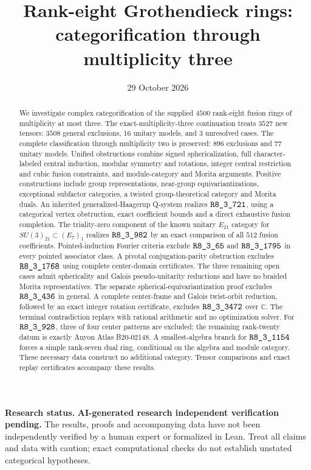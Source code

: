 \documentclass[11pt,reqno]{amsart}
\title{Rank-eight Grothendieck rings:\\
categorification through multiplicity three}
\date{29 October 2026}
\theoremstyle{definition}
\theoremstyle{remark}
\newcommand{\sha}[1]{\texttt{\detokenize{#1}}}
\begin{document}
\begin{abstract}
We investigate complex categorification of the supplied $4500$ rank-eight fusion rings of multiplicity at most three. The exact-multiplicity-three continuation treats $3527$ new tensors: $3508$ general exclusions, $16$ unitary models, and $3$ unresolved cases. The complete classification through multiplicity two is preserved: $896$ exclusions and $77$ unitary models. Unified obstructions combine signed sphericalization, full character-labeled central induction, modular symmetry and rotations, integer central restriction and cubic fusion constraints, and module-category and Morita arguments. Positive constructions include group representations, near-group equivariantizations, exceptional subfactor categories, a twisted group-theoretical category and Morita duals. An inherited generalized-Haagerup Q-system realizes $\sha{R8_3_721}$, using a categorical vertex obstruction, exact coefficient bounds and a direct exhaustive fusion completion. The triality-zero component of the known unitary $E_{21}$ category for $SU(3)_{21}\subset(E_7)_1$ realizes $\sha{R8_3_982}$ by an exact comparison of all $512$ fusion coefficients. Pointed-induction Fourier criteria exclude $\sha{R8_3_65}$ and $\sha{R8_3_1795}$ in every pointed associator class. A pivotal conjugation-parity obstruction excludes $\sha{R8_3_1768}$ using complete center-domain certificates. The three remaining open cases admit sphericality and Galois pseudo-unitarity reductions and have no braided Morita representatives. The separate spherical-equivariantization proof excludes $\sha{R8_3_436}$ in general. A complete center-frame and Galois twist-orbit reduction, followed by an exact integer rotation certificate, excludes $\sha{R8_3_3472}$ over $\mathbb C$. The terminal contradiction replays with rational arithmetic and no optimization solver. For $\sha{R8_3_928}$, three of four center patterns are excluded; the remaining rank-twenty datum is exactly Anyon Atlas B20-02148. A smallest-algebra branch for $\sha{R8_3_1154}$ forces a simple rank-seven dual ring, conditional on the algebra and module category. These necessary data construct no additional category. Tensor comparisons and exact replay certificates accompany these results.
\end{abstract}
\maketitle
\raggedbottom
\par\smallskip\noindent\textbf{Research status.}
\textbf{AI-generated research \textperiodcentered{} independent verification pending.}
The results, proofs and accompanying data have not been independently verified
by a human expert or formalized in Lean.
Treat all claims and data with caution; exact computational checks do not establish
unstated categorical hypotheses.
\end{document}
